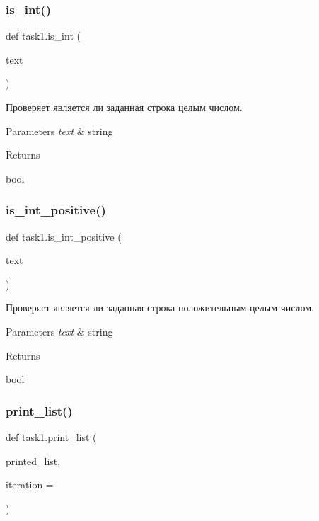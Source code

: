 \subsubsection{\texorpdfstring{is\+\_\+int()}{is\_int()}}
{\footnotesize\ttfamily def task1.\+is\+\_\+int (\begin{DoxyParamCaption}\item[{}]{text }\end{DoxyParamCaption})}



Проверяет является ли заданная строка целым числом. 


\begin{DoxyParams}{Parameters}
{\em text} & string\\
\hline
\end{DoxyParams}
\begin{DoxyReturn}{Returns}


bool 
\end{DoxyReturn}
\mbox{\label{namespacetask1_a69c4434b737c41694f1d2aee91ba895b}} 
\subsubsection{\texorpdfstring{is\+\_\+int\+\_\+positive()}{is\_int\_positive()}}
{\footnotesize\ttfamily def task1.\+is\+\_\+int\+\_\+positive (\begin{DoxyParamCaption}\item[{}]{text }\end{DoxyParamCaption})}



Проверяет является ли заданная строка положительным целым числом. 


\begin{DoxyParams}{Parameters}
{\em text} & string\\
\hline
\end{DoxyParams}
\begin{DoxyReturn}{Returns}


bool 
\end{DoxyReturn}
\mbox{\label{namespacetask1_acd7e027a601d75cec619047125864296}} 
\subsubsection{\texorpdfstring{print\+\_\+list()}{print\_list()}}
{\footnotesize\ttfamily def task1.\+print\+\_\+list (\begin{DoxyParamCaption}\item[{}]{printed\+\_\+list,  }\item[{}]{iteration = {} }\end{DoxyParamCaption})}



